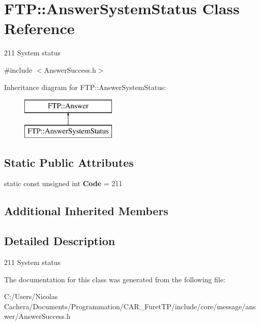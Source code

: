\hypertarget{classFTP_1_1AnswerSystemStatus}{}\section{F\+T\+P\+:\+:Answer\+System\+Status Class Reference}
\label{classFTP_1_1AnswerSystemStatus}


211 System status  




{\ttfamily \#include $<$Answer\+Success.\+h$>$}

Inheritance diagram for F\+T\+P\+:\+:Answer\+System\+Status\+:\begin{figure}[H]
\begin{center}
\leavevmode
\includegraphics[height=2.000000cm]{classFTP_1_1AnswerSystemStatus}
\end{center}
\end{figure}
\subsection*{Static Public Attributes}
\begin{DoxyCompactItemize}
\item 
\hypertarget{classFTP_1_1AnswerSystemStatus_abb133d330c4bffaab044b3300ed49a65}{}static const unsigned int {\bfseries Code} = 211\label{classFTP_1_1AnswerSystemStatus_abb133d330c4bffaab044b3300ed49a65}

\end{DoxyCompactItemize}
\subsection*{Additional Inherited Members}


\subsection{Detailed Description}
211 System status 

The documentation for this class was generated from the following file\+:\begin{DoxyCompactItemize}
\item 
C\+:/\+Users/\+Nicolas Cachera/\+Documents/\+Programmation/\+C\+A\+R\+\_\+\+Furet\+T\+P/include/core/message/answer/Answer\+Success.\+h\end{DoxyCompactItemize}
